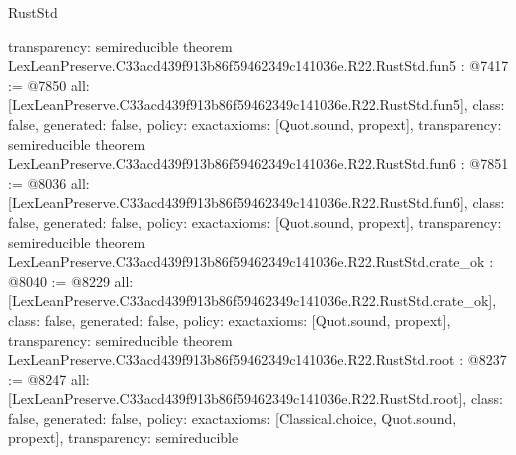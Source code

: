 \begin{lexlean}{RustStd}
\begin{coremodule}
{  transparency: semireducible
}
theorem LexLeanPreserve.C33acd439f913b86f59462349c141036e.R22.RustStd.fun5 : @7417 := @7850 {
  all: [LexLeanPreserve.C33acd439f913b86f59462349c141036e.R22.RustStd.fun5],
  class: false,
  generated: false,
  policy: exact{axioms: [Quot.sound, propext]},
  transparency: semireducible
}
theorem LexLeanPreserve.C33acd439f913b86f59462349c141036e.R22.RustStd.fun6 : @7851 := @8036 {
  all: [LexLeanPreserve.C33acd439f913b86f59462349c141036e.R22.RustStd.fun6],
  class: false,
  generated: false,
  policy: exact{axioms: [Quot.sound, propext]},
  transparency: semireducible
}
theorem LexLeanPreserve.C33acd439f913b86f59462349c141036e.R22.RustStd.crate_ok : @8040 := @8229 {
  all: [LexLeanPreserve.C33acd439f913b86f59462349c141036e.R22.RustStd.crate_ok],
  class: false,
  generated: false,
  policy: exact{axioms: [Quot.sound, propext]},
  transparency: semireducible
}
theorem LexLeanPreserve.C33acd439f913b86f59462349c141036e.R22.RustStd.root : @8237 := @8247 {
  all: [LexLeanPreserve.C33acd439f913b86f59462349c141036e.R22.RustStd.root],
  class: false,
  generated: false,
  policy: exact{axioms: [Classical.choice, Quot.sound, propext]},
  transparency: semireducible
}


\end{coremodule}
\end{lexlean}
